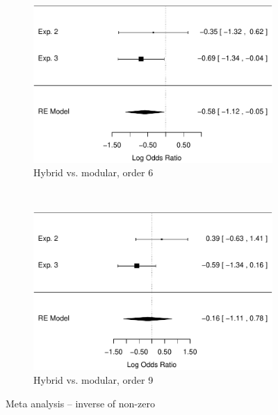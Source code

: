 \documentclass[man,10pt]{apa6}
\begin{document}
\begin{figure}
\begin{subfigure}[c]{0.4\textwidth}
\end{subfigure} \\
\centering
\begin{subfigure}[c]{0.4\textwidth}
\centering
\includegraphics[width=\textwidth]{figures/meta/question_typeinverse_nonzero_6_conditionhybrid.pdf}
\caption{Hybrid vs. modular, order 6}
\end{subfigure}
~
\begin{subfigure}[c]{0.4\textwidth}
\centering
\includegraphics[width=\textwidth]{figures/meta/question_typeinverse_nonzero_9_conditionhybrid.pdf}
\caption{Hybrid vs. modular, order 9}
\end{subfigure}
\caption{Meta analysis -- inverse of non-zero}
\label{meta_inNZ}
\end{figure}\noindent 

\FloatBarrier
\end{document}
